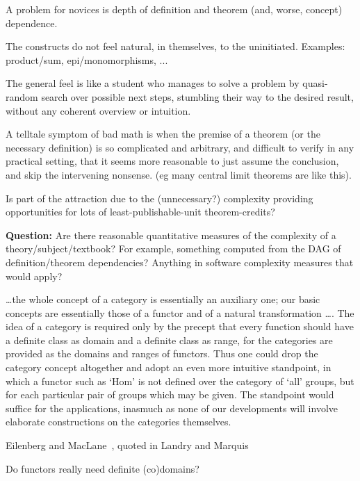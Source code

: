 \documentclass[11pt,openany]{article}
\begin{document}
A problem for novices is depth of definition and theorem
(and, worse, concept) dependence.

The constructs do not feel natural, in themselves, 
to the uninitiated.
Examples: product/sum, epi/monomorphisms, ...

The general feel is like a student who manages to solve a problem
by quasi-random search over possible next steps,
stumbling their way to the desired result,
without any coherent overview or intuition.

A telltale symptom of bad math is when the premise of a theorem
(or the necessary definition) is so complicated and arbitrary,
and difficult to verify in any practical setting,
that it seems more reasonable to just assume the conclusion,
and skip the intervening nonsense.
(eg many central limit theorems are like this).

Is part of the attraction due to the (unnecessary?)
complexity providing opportunities for lots of
least-publishable-unit theorem-credits?

\textbf{Question:} Are there reasonable quantitative measures
of the complexity of a theory/subject/textbook?
For example, something computed from the DAG of
definition/theorem dependencies?
Anything in software complexity measures that would apply?

\label{sec:arrow-more-general}

\epigraph{\ldots the whole concept of a category is essentially 
an auxiliary
one; our basic concepts are essentially those of a functor and of
a natural transformation {\ldots}. 
The idea of a category is required
only by the precept that every function should have a definite
class as domain and a definite class as range, for the categories
are provided as the domains and ranges of functors. Thus one
could drop the category concept altogether and adopt an even
more intuitive standpoint, in which a functor such as ‘Hom’ is
not defined over the category of ‘all’ groups, 
but for each particular
pair of groups which may be given. The standpoint would
suffice for the applications, inasmuch as none of our developments
will involve elaborate constructions on the categories
themselves.}
{Eilenberg and 
MacLane~\cite[p~247]{eilenberg-maclane-1945-general},
quoted in Landry and 
Marquis~\cite[p~3]{landry-marquis-2005-cat-theory-context)}}

Do functors really need definite (co)domains?
\end{document}
